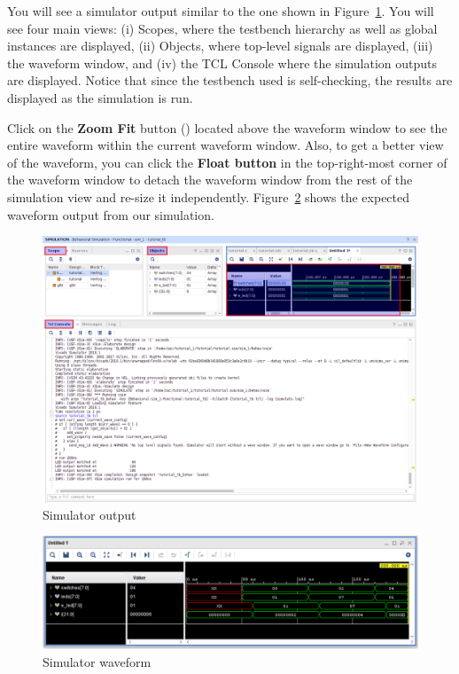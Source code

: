 \documentclass[11pt]{article}
\begin{document}
You will see a simulator output similar to the one shown in Figure~\ref{fig:sim_output}. You will see four main views: (i) Scopes, where the testbench hierarchy as well as global instances are displayed, (ii) Objects, where top-level signals are displayed, (iii) the waveform window, and (iv) the TCL Console where the simulation outputs are displayed. Notice that since the testbench used is self-checking, the results are displayed as the simulation is run. 

Click on the \textbf{Zoom Fit} button
()
located above the waveform window to see the entire waveform within the current waveform window. Also, to get a better view of the waveform, you can click the \textbf{Float button} in the top-right-most corner of the waveform window to detach the waveform window from the rest of the simulation view and re-size it independently. Figure~\ref{fig:sim_wave} shows the expected waveform output from our simulation.

\begin{figure}[!h]
    \centering
    \includegraphics[width=\textwidth]{images/sim_output.png}
    \caption{Simulator output}
    \label{fig:sim_output}
\end{figure}

\begin{figure}[!h]
    \centering
    \includegraphics[width=\textwidth]{images/sim_wave.png}
    \caption{Simulator waveform}
    \label{fig:sim_wave}
\end{figure}
\end{document}
